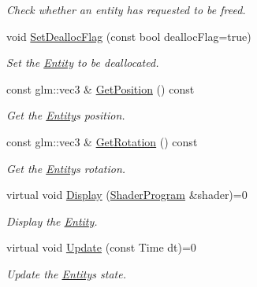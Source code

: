 \begin{DoxyCompactItemize}
\begin{DoxyCompactList}\small\item\em Check whether an entity has requested to be freed. \end{DoxyCompactList}\item 
\mbox{\label{class_f_l_i_g_h_t_1_1_entity_a6f6d61a5135159ae276e3d6c45b237dc}} 
void \hyperlink{class_f_l_i_g_h_t_1_1_entity_a6f6d61a5135159ae276e3d6c45b237dc}{Set\+Dealloc\+Flag} (const bool dealloc\+Flag=true)
\begin{DoxyCompactList}\small\item\em Set the \hyperlink{class_f_l_i_g_h_t_1_1_entity}{Entity} to be deallocated. \end{DoxyCompactList}\item 
const glm\+::vec3 \& \hyperlink{class_f_l_i_g_h_t_1_1_entity_a3382ef22723d49381cfb769a6cbb1e40}{Get\+Position} () const
\begin{DoxyCompactList}\small\item\em Get the \hyperlink{class_f_l_i_g_h_t_1_1_entity}{Entity}\textquotesingle{}s position. \end{DoxyCompactList}\item 
const glm\+::vec3 \& \hyperlink{class_f_l_i_g_h_t_1_1_entity_ab46f5b05bea68723e1cf7bd7b81b9222}{Get\+Rotation} () const
\begin{DoxyCompactList}\small\item\em Get the \hyperlink{class_f_l_i_g_h_t_1_1_entity}{Entity}\textquotesingle{}s rotation. \end{DoxyCompactList}\item 
virtual void \hyperlink{class_f_l_i_g_h_t_1_1_entity_aa7416cd150913194b32255a46c2848ba}{Display} (\hyperlink{class_f_l_i_g_h_t_1_1_shader_program}{Shader\+Program} \&shader)=0
\begin{DoxyCompactList}\small\item\em Display the \hyperlink{class_f_l_i_g_h_t_1_1_entity}{Entity}. \end{DoxyCompactList}\item 
virtual void \hyperlink{class_f_l_i_g_h_t_1_1_entity_afb03ab9c3239e0651101cc3103c7c503}{Update} (const Time dt)=0
\begin{DoxyCompactList}\small\item\em Update the \hyperlink{class_f_l_i_g_h_t_1_1_entity}{Entity}\textquotesingle{}s state. \end{DoxyCompactList}\end{DoxyCompactItemize}


